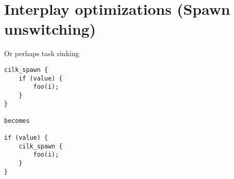 \section{Interplay optimizations (Spawn unswitching)}

Or perhaps task sinking
\begin{verbatim}
cilk_spawn {
    if (value) {
        foo(i);
    }
}

becomes

if (value) {
    cilk_spawn {
        foo(i);
    }
}
\end{verbatim}




